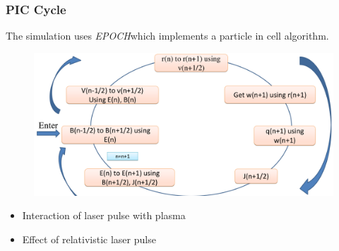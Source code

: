 \documentclass{beamer}
\begin{document}
\begin{frame}
    \frametitle{PIC Cycle}
    \small
    The simulation uses \textit{EPOCH}\footnotemark  which implements a particle in cell algorithm.
    \begin{figure}
        \centering
        \includegraphics[width=1.0\textwidth, height=0.50\textheight]{images/PIC.png}
        \label{fig:pic}
    \end{figure}
    \begin{itemize}
        \item Interaction of laser pulse with plasma
        \item Effect of relativistic laser pulse
    \end{itemize}
\end{frame}
\end{document}
